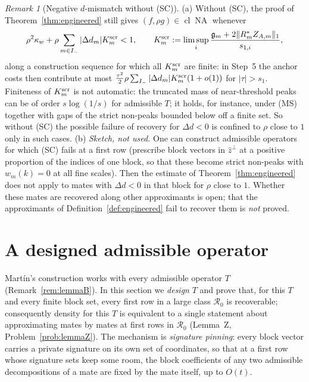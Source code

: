 \documentclass[10pt]{amsart}
\theoremstyle{definition}
\theoremstyle{remark}
\newtheorem{remark}[theorem]{Remark}
\newcommand{\NA}{\operatorname{NA}}
\newcommand{\cl}{\operatorname{cl}}
\newcommand{\zh}{\hat z}
\begin{document}
\begin{remark}[Negative $d$-mismatch without \textup{(SC)}]\label{rem:withoutSC}
(a) Without \textup{(SC)}, the proof of Theorem~\ref{thm:engineered} still
gives $(f,\rho g)\in\cl\NA$ whenever
\[
 \rho^2\kappa_w+\rho\sum_{m\in I_-}|\Delta d_m|K^{\rm scr}_m<1,\qquad
 K^{\rm scr}_m:=\limsup_i\frac{\mathfrak g_m+2\|R^*_mZ_{A,m}\|_1}{s_{1,i}},
\]
along a construction sequence for which all $K^{\rm scr}_m$ are finite: in
Step~5 the anchor costs then contribute at most
$\frac{\tau^2}2\rho\sum_{I_-}|\Delta d_m|K^{\rm scr}_m(1+o(1))$ for
$|\tau|>s_1$.  Finiteness of $K^{\rm scr}_m$ is not automatic: the truncated
mass of near-threshold peaks can be of order $s\log(1/s)$ for admissible
$T$; it holds, for instance, under \textup{(MS)} together with gaps of the
strict non-peaks bounded below off a finite set.  So without \textup{(SC)}
the possible failure of recovery for $\Delta d<0$ is confined to $\rho$
close to $1$ only in such cases.
(b) \emph{Sketch, not used.}  One can construct admissible operators for
which \textup{(SC)} fails at a first row (prescribe block vectors in
$\zh^\perp$ at a positive proportion of the indices of one block, so that
these become strict non-peaks with $w_m(k)=0$ at all fine scales).  Then the
estimate of Theorem~\ref{thm:engineered} does not apply to mates with
$\Delta d<0$ in that block for $\rho$ close to $1$.  Whether these mates are
recovered along other approximants is open; that the approximants of
Definition~\ref{def:engineered} fail to recover them is \emph{not} proved.
\end{remark}

\section{A designed admissible operator}\label{sec:designed}

Mart\'in's construction works with every admissible operator $T$
(Remark~\ref{rem:lemmaB}).  In this section we \emph{design} $T$ and prove
that, for this $T$ and every finite block set, every first row in a large
class $\mathcal R_0$ is recoverable; consequently density for this $T$ is
equivalent to a single statement about approximating mates by mates at
first rows in $\mathcal R_0$ (Lemma~Z, Problem~\ref{prob:lemmaZ}).  The
mechanism is \emph{signature pinning}: every block vector carries a private
signature on its own set of coordinates, so that at a first row whose
signature sets keep some room, the block coefficients of any two admissible
decompositions of a mate are fixed by the mate itself, up to $O(t)$.
\end{document}
